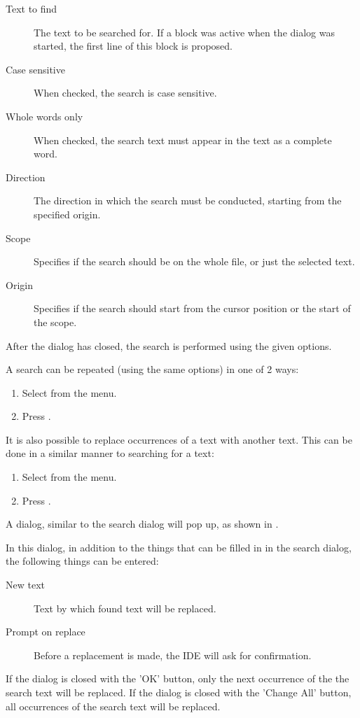 
\begin{description}
\item[Text to find] The text to be searched for. If a block was active when
the dialog was started, the first line of this block is proposed.
\item[Case sensitive] When checked, the search is case sensitive.
\item[Whole words only] When checked, the search text must appear in the
text as a complete word.
\item[Direction] The direction in which the search must be conducted,
starting from the specified origin.
\item[Scope] Specifies if the search should be on the whole file, or just the selected
text.
\item[Origin] Specifies if the search should start from the cursor position or the start
of the scope.
\end{description}
After the dialog has closed, the search is performed using the given options.

A search can be repeated (using the same options) in one of 2 ways:
\begin{enumerate}
\item Select  from the menu.
\item Press .
\end{enumerate}

It is also possible to replace occurrences of a text with another text.
This can be done in a similar manner to searching for a text:
\begin{enumerate}
\item Select  from the menu.
\item Press .
\end{enumerate}
A dialog, similar to the search dialog will pop up, as shown in .


In this dialog, in addition to the things that can be filled in in the
search dialog, the following things can be entered:
\begin{description}
\item [New text] Text by which found text will be replaced.
\item [Prompt on replace] Before a replacement is made, the IDE will ask for
confirmation.
\end{description}
If the dialog is closed with the 'OK' button, only the next occurrence of
the the search text will be replaced.
If the dialog is closed with the 'Change All' button, all occurrences of
the search text will be replaced.

